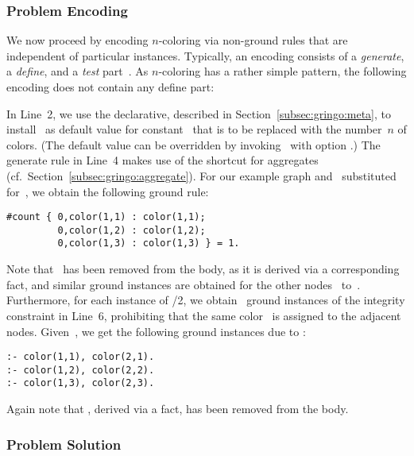 \subsubsection{Problem Encoding}\label{subsec:color:encoding}

We now proceed by encoding $n$-coloring via non-ground rules that are
independent of particular instances.
Typically, an encoding consists of a \emph{generate}, a \emph{define},
and a \emph{test} part~\cite{lifschitz02a}.
As $n$-coloring has a rather simple pattern, the following encoding does
not contain any define part:
%

%
In Line~2, we use the  declarative,
described in Section~\ref{subsec:gringo:meta},
to install~ as default value for constant~ that is to be replaced
with the number~$n$ of colors.
(The default value can be overridden by invoking \gringo\ with option
 .)
The generate rule in Line~4 makes use of the shortcut for  aggregates
(cf.\ Section~\ref{subsec:gringo:aggregate}).
For our example graph and~ substituted for~,
we obtain the following ground rule:%
%
\begin{lstlisting}[numbers=none]
#count { 0,color(1,1) : color(1,1);
         0,color(1,2) : color(1,2);
         0,color(1,3) : color(1,3) } = 1.
\end{lstlisting}
%
Note that~ has been removed from the body,
as it is derived via a corresponding fact,
and similar ground instances are obtained for the other nodes~ to~.
Furthermore, for each instance of /2,
we obtain~ ground instances of the integrity constraint in Line~6,
prohibiting that the same color~ is assigned to the adjacent nodes.
Given~,
we get the following ground instances due to :
%
\begin{lstlisting}[numbers=none]
:- color(1,1), color(2,1).
:- color(1,2), color(2,2).
:- color(1,3), color(2,3).
\end{lstlisting}
%
Again note that ,
derived via a fact, has been removed from the body.

\subsubsection{Problem Solution}\label{subsec:color:solution}



